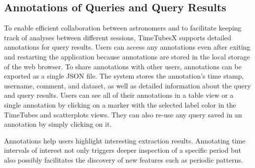 \subsection{Annotations of Queries and Query Results}
%
To enable efficient collaboration between astronomers and to facilitate keeping track of analyses between different sessions, TimeTubesX supports detailed annotations for query results.
%
Users can access any annotations even after exiting and restarting the application because annotations are stored in the local storage of the web browser. 
To share annotations with other users, annotations can be exported as a single JSON file. 
The system stores the annotation's time stamp, username, comment, and dataset, as well as detailed information about the query and query results.
Users can see all of their annotations in a table view or a single annotation by clicking on a marker with the selected label color in the TimeTubes and scatterplots views.
They can also re-use any query saved in an annotation by simply clicking on it. %

Annotations help users highlight interesting extraction results.
%
%
Annotating time intervals of interest not only triggers deeper inspection of a specific period 
but also possibly facilitates the discovery of new features such as periodic patterns.






